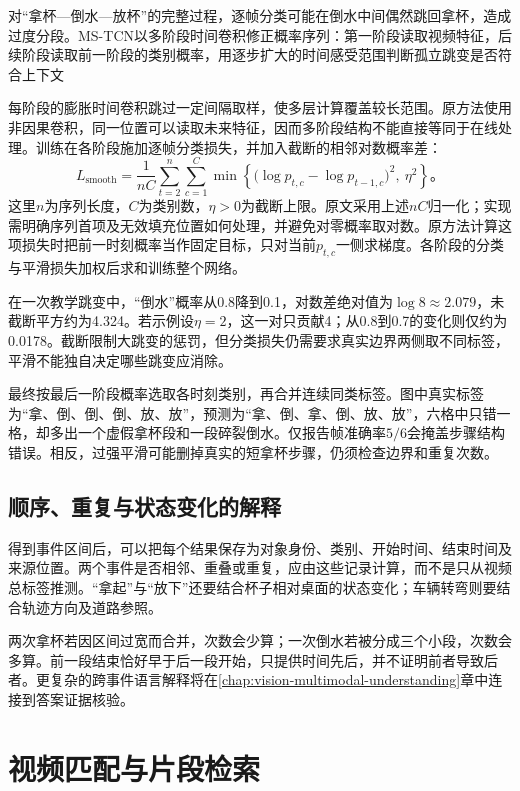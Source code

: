 对“拿杯—倒水—放杯”的完整过程，逐帧分类可能在倒水中间偶然跳回拿杯，造成过度分段。MS-TCN以多阶段时间卷积修正概率序列：第一阶段读取视频特征，后续阶段读取前一阶段的类别概率，用逐步扩大的时间感受范围判断孤立跳变是否符合上下文

每阶段的膨胀时间卷积跳过一定间隔取样，使多层计算覆盖较长范围。原方法使用非因果卷积，同一位置可以读取未来特征，因而多阶段结构不能直接等同于在线处理。训练在各阶段施加逐帧分类损失，并加入截断的相邻对数概率差：
\begin{equation}
  L_{\mathrm{smooth}}
  =\frac{1}{nC}\sum_{t=2}^{n}\sum_{c=1}^{C}
  \min\!\left\{
  \bigl(\log p_{t,c}-\log p_{t-1,c}\bigr)^2,\ \eta^2
  \right\}\text{。}
  \label{eq:vision-video-smoothing}
\end{equation}
这里$n$为序列长度，$C$为类别数，$\eta>0$为截断上限。原文采用上述$nC$归一化；实现需明确序列首项及无效填充位置如何处理，并避免对零概率取对数。原方法计算这项损失时把前一时刻概率当作固定目标，只对当前$p_{t,c}$一侧求梯度。各阶段的分类与平滑损失加权后求和训练整个网络。

在一次教学跳变中，“倒水”概率从0.8降到0.1，对数差绝对值为$\log 8\approx2.079$，未截断平方约为4.324。若示例设$\eta=2$，这一对只贡献4；从0.8到0.7的变化则仅约为0.0178。截断限制大跳变的惩罚，但分类损失仍需要求真实边界两侧取不同标签，平滑不能独自决定哪些跳变应消除。

最终按最后一阶段概率选取各时刻类别，再合并连续同类标签。图中真实标签为“拿、倒、倒、倒、放、放”，预测为“拿、倒、拿、倒、放、放”，六格中只错一格，却多出一个虚假拿杯段和一段碎裂倒水。仅报告帧准确率$5/6$会掩盖步骤结构错误。相反，过强平滑可能删掉真实的短拿杯步骤，仍须检查边界和重复次数。

\subsection{顺序、重复与状态变化的解释}
\label{sec:vision-video-event-relations}

得到事件区间后，可以把每个结果保存为对象身份、类别、开始时间、结束时间及来源位置。两个事件是否相邻、重叠或重复，应由这些记录计算，而不是只从视频总标签推测。“拿起”与“放下”还要结合杯子相对桌面的状态变化；车辆转弯则要结合轨迹方向及道路参照。

两次拿杯若因区间过宽而合并，次数会少算；一次倒水若被分成三个小段，次数会多算。前一段结束恰好早于后一段开始，只提供时间先后，并不证明前者导致后者。更复杂的跨事件语言解释将在\ref{chap:vision-multimodal-understanding}章中连接到答案证据核验。

\section{视频匹配与片段检索}
\label{sec:vision-video-retrieval}


